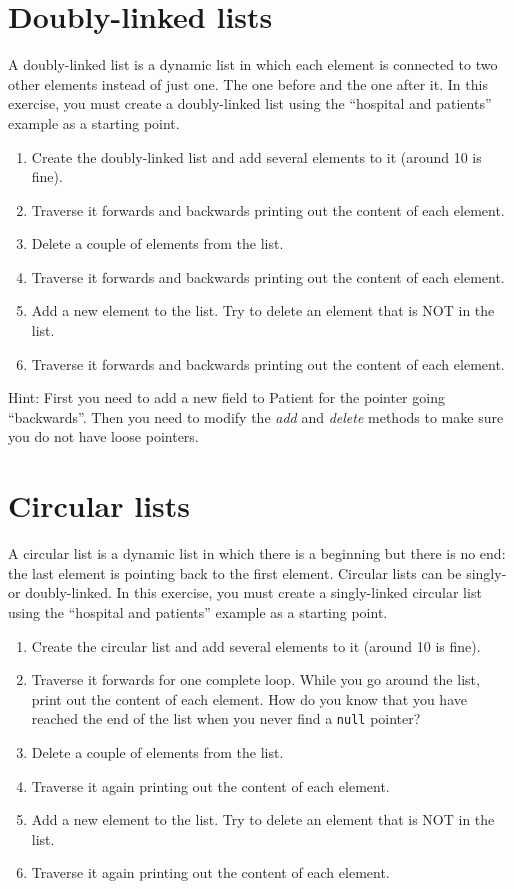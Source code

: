 \documentclass{article}
\begin{document}
\section{Doubly-linked lists}
\label{sec:doublyr-linked-lists}

A doubly-linked list is a dynamic list in which each element is
connected to two other elements instead of just one. The one before
and the one after it. In this exercise, you must create a
doubly-linked list using the ``hospital and patients'' example as a
starting point.

\begin{enumerate}
\item Create the doubly-linked list and add several elements to it
  (around 10 is fine). 
\item Traverse it forwards and backwards printing out the content of
  each element.
\item Delete a couple of elements from the list. 
\item Traverse it forwards and backwards printing out the content of
  each element.
\item Add a new element to the list. Try to delete an element that is
  NOT in the list. 
\item Traverse it forwards and backwards printing out the content of
  each element.
\end{enumerate}

Hint: First you need to add a new field to Patient for the pointer
going ``backwards''. Then you need to modify the \emph{add} and
\emph{delete} methods to make sure you do not have loose pointers. 

\section{Circular lists}
\label{sec:circular-lists}

A circular list is a dynamic list in which there is a beginning but
there is no end: the last element is pointing back to the first
element. Circular lists can be singly- or doubly-linked. In this
exercise, you must create a singly-linked circular list using the
``hospital and patients'' example as a starting point.

\begin{enumerate}
\item Create the circular list and add several elements to it
  (around 10 is fine). 
\item Traverse it forwards for one complete loop. While you go around
  the list, print out the content of each element. How do you know
  that you have reached the end of the list when you never find a
  \verb+null+ pointer? 
\item Delete a couple of elements from the list. 
\item Traverse it again printing out the content of
  each element.
\item Add a new element to the list. Try to delete an element that is
  NOT in the list. 
\item Traverse it again printing out the content of
  each element.
\end{enumerate}
\end{document}

